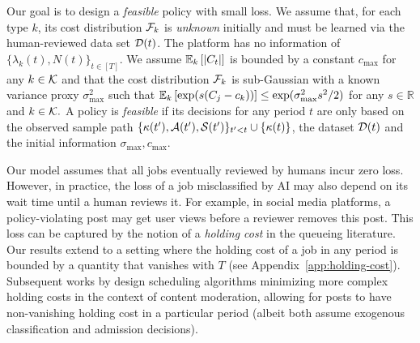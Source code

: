Our goal is to design a \emph{feasible} policy with small loss. We assume that, for each type $k$, its cost distribution $\mathcal{F}_k$ is \emph{unknown} initially and must be learned via the human-reviewed data set $\mathcal{D}(t)$. The platform has no information of $\{\lambda_k(t),N(t)\}_{t \in [T]}$. We assume $\mathbb E_{k}\left[|C_t|\right]$ is bounded by a constant $c_{\max}$ for any $k \in \mathcal{K}$ and that the cost distribution $\mathcal{F}_k$ is sub-Gaussian with a known variance proxy $\sigma_{\max}^2$ such that $\mathbb E_{k}\left[\exp(s(C_j - c_k))\right] \leq \exp(\sigma_{\max}^2 s^2/2)$ for any $s \in \mathbb{R}$ and $k \in \mathcal{K}.$ A policy is \emph{feasible} if its decisions for any period $t$ are only based on the observed sample path $\{\kappa(t'),\mathcal{A}(t'),\mathcal{S}(t')\}_{t' < t} \cup \{\kappa(t)\}$, the dataset $\mathcal{D}(t)$ and the initial information $\sigma_{\max}, c_{\max}$.

\begin{remark}\label{remark:holding_loss}
Our model assumes that all jobs eventually reviewed by humans incur zero loss. However, in practice, the loss of a job misclassified by AI may also depend on its wait time until a human reviews it. For example, in social media platforms, a policy-violating post may get user views before a reviewer removes this post. This loss can be captured by the notion of a \emph{holding cost} in the queueing literature. Our results extend to a setting where the holding cost of a job in any period is bounded by a quantity that vanishes with $T$ (see Appendix~\ref{app:holding-cost}). Subsequent works by \cite{lee2024design, gocmen2025scheduling} design scheduling algorithms minimizing more complex holding costs in the context of content moderation, allowing for posts to have non-vanishing holding cost in a particular period (albeit both \cite{lee2024design, gocmen2025scheduling} assume exogenous classification and admission decisions).
\end{remark}

